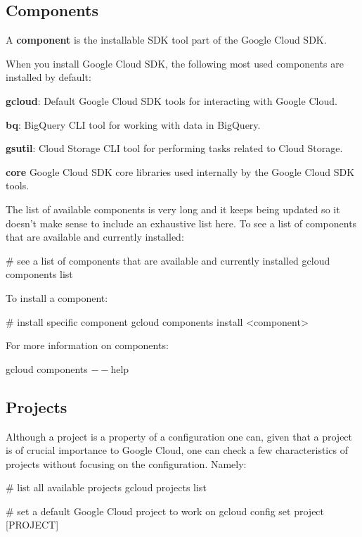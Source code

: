\subsection{Components}

\bd[Component]
A \textbf{component} is the installable SDK tool part of the Google Cloud SDK\@.
\ed

When you install Google Cloud SDK, the following most used components are installed by default:
\bit
\item \textbf{gcloud}: Default Google Cloud SDK tools for interacting with Google Cloud.
\item \textbf{bq}: BigQuery CLI tool for working with data in BigQuery.
\item \textbf{gsutil}: Cloud Storage CLI tool for performing tasks related to Cloud Storage.
\item \textbf{core} Google Cloud SDK core libraries used internally by the Google Cloud SDK tools.
\eit

The list of available components is very long and it keeps being updated so it doesn't make sense to include
an exhaustive list here. To see a list of components that are available and currently installed:
\begin{bash}
# see a list of components that are available and currently installed
gcloud components list
\end{bash}

To install a component:
\begin{bash}
# install specific component
gcloud components install <component>
\end{bash}

For more information on components:
\begin{bash}
gcloud components $--$help
\end{bash}

\subsection{Projects}

Although a project is a property of a configuration one can, given that a project is of crucial importance to Google
Cloud, one can check a few characteristics of projects without focusing on the configuration. Namely:
\begin{bash}
# list all available projects
gcloud projects list
\end{bash}

\begin{bash}
# set a default Google Cloud project to work on
gcloud config set project [PROJECT]
\end{bash}

